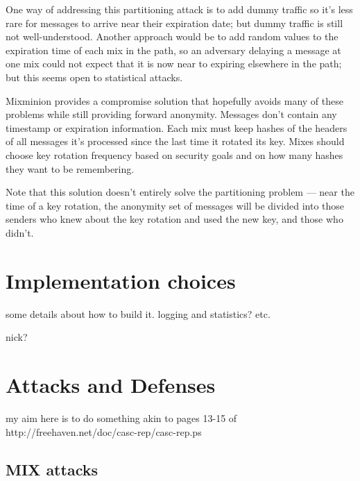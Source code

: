 \documentclass{llncs}
\begin{document}
{%

One way of addressing this partitioning attack is to add dummy traffic
so it's less rare for messages to arrive near their expiration date;
but dummy traffic is still not well-understood. Another approach would
be to add random values to the expiration time of each mix in the path,
so an adversary delaying a message at one mix could not expect that it
is now near to expiring elsewhere in the path; but this seems open to
statistical attacks.

Mixminion provides a compromise solution that hopefully avoids many of
these problems while still providing forward anonymity. Messages don't
contain any timestamp or expiration information. Each mix must keep
hashes of the headers of all messages it's processed since the last time
it rotated its key. Mixes should choose key rotation frequency based on
security goals and on how many hashes they want to be remembering.

Note that this solution doesn't entirely solve the partitioning problem
--- near the time of a key rotation, the anonymity set of messages will
be divided into those senders who knew about the key rotation and used
the new key, and those who didn't.


\section{Implementation choices}
\label{sec:implementation}

some details about how to build it. logging and statistics? etc.

nick?


\section{Attacks and Defenses}
\label{sec:attacks}

my aim here is to do something akin to pages 13-15 of
http://freehaven.net/doc/casc-rep/casc-rep.ps

\subsection{MIX attacks}
\label{subsec:mix-attacks}

}
\end{document}
